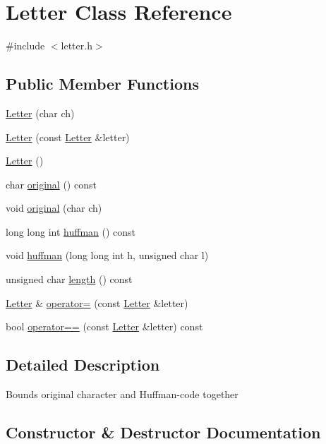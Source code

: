 \hypertarget{class_letter}{}\section{Letter Class Reference}
\label{class_letter}


{\ttfamily \#include $<$letter.\+h$>$}

\subsection*{Public Member Functions}
\begin{DoxyCompactItemize}
\item 
\hyperlink{class_letter_a9e19a8d3beff29261731496902b885bf}{Letter} (char ch)
\item 
\hyperlink{class_letter_a20efe02d84add2ca7b89e43f629bc128}{Letter} (const \hyperlink{class_letter}{Letter} \&letter)
\item 
\hyperlink{class_letter_ac390dd9bfbdd7a0965cd74b3eccee010}{Letter} ()
\item 
char \hyperlink{class_letter_a9ae0471d69dddf53a0a64219233d0c4a}{original} () const
\item 
void \hyperlink{class_letter_af6158c9bc58d3f4b77ee627807b87133}{original} (char ch)
\item 
long long int \hyperlink{class_letter_af52f553dafb323384339dcfaa1a7eaa6}{huffman} () const
\item 
void \hyperlink{class_letter_ac345d7df6c98a9aea64f77d55267f820}{huffman} (long long int h, unsigned char l)
\item 
unsigned char \hyperlink{class_letter_a06c63721ba0b1c40ac7591835f2e6e43}{length} () const
\item 
\hyperlink{class_letter}{Letter} \& \hyperlink{class_letter_a9da69c0371f32304bbbe5c9b97160eef}{operator=} (const \hyperlink{class_letter}{Letter} \&letter)
\item 
bool \hyperlink{class_letter_a5ed233b62c83d0a84cd40a42b9a90657}{operator==} (const \hyperlink{class_letter}{Letter} \&letter) const
\end{DoxyCompactItemize}


\subsection{Detailed Description}
Bounds original character and Huffman-\/code together 

\subsection{Constructor \& Destructor Documentation}
\mbox{\label{class_letter_a9e19a8d3beff29261731496902b885bf}} 

